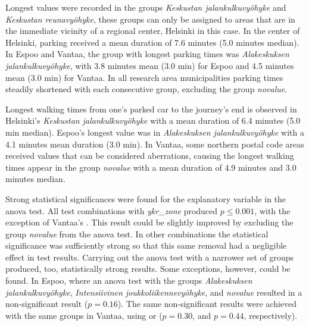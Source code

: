 Longest  values were recorded in the groups \textit{Keskustan jalankulkuvyöhyke} and \textit{Keskustan reunavyöhyke}, these groups can only be assigned to areas that are in the immediate vicinity of a regional center, Helsinki in this case. In the center of Helsinki, parking received a mean duration of 7.6 minutes (5.0 minutes median). In Espoo and Vantaa, the group with longest parking times was \textit{Alakeskuksen jalankulkuvyöhyke}, with 3.8 minutes mean (3.0 min) for Espoo and 4.5 minutes mean (3.0 min) for Vantaa. In all research area municipalities parking times steadily shortened with each consecutive group, excluding the group \textit{novalue}.

Longest walking times from one's parked car to the journey's end is observed in Helsinki's \textit{Keskustan jalankulkuvyöhyke} with a mean duration of 6.4 minutes (5.0 min median). Espoo's longest  value was in \textit{Alakeskuksen jalankulkuvyöhyke} with a 4.1 minutes mean duration (3.0 min). In Vantaa, some northern postal code areas received  values that can be considered aberrations, causing the longest walking times appear in the group \textit{novalue} with a mean duration of 4.9 minutes and 3.0 minutes median.

Strong statistical significances were found for the explanatory variable  in the \acrshort{anova} test. All test combinations with \textit{ykr\_zone} produced $p \leq 0.001$, with the exception of Vantaa's . This result could be slightly improved by excluding the group \textit{novalue} from the \acrshort{anova} test. In other combinations the statistical significance was sufficiently strong so that this same removal had a negligible effect in test results. Carrying out the \acrshort{anova} test with a narrower set of groups produced, too, statistically strong results. Some exceptions, however, could be found. In Espoo, where an \acrshort{anova} test with the groups \textit{Alakeskuksen jalankulkuvyöhyke}, \textit{Intensiivinen joukkoliikennevyöhyke}, and \textit{novalue} resulted in a non-significant result ($p = 0.16$). The same non-significant results were achieved with the same groups in Vantaa, using  or  ($p = 0.30$, and $p = 0.44$, respectively).

